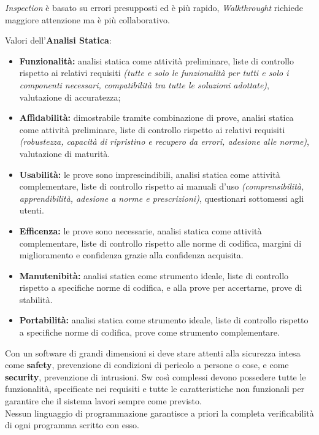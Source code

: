 \textit{Inspection} è basato su errori presupposti ed è più rapido, \textit{Walkthrought} richiede maggiore attenzione ma è più collaborativo.

Valori dell'\textbf{Analisi Statica}:

\begin{itemize}
	\item \textbf{Funzionalità:} analisi statica come attività preliminare, liste di controllo rispetto ai relativi requisiti \textit{(tutte e solo le funzionalità per tutti e solo i componenti necessari, compatibilità tra tutte le soluzioni adottate)}, valutazione di accuratezza;
	\item \textbf{Affidabilità:} dimostrabile tramite combinazione di prove, analisi statica come attività preliminare, liste di controllo rispetto ai relativi requisiti \textit{(robustezza, capacità di ripristino e recupero da errori, adesione alle norme)}, valutazione di maturità.
	\item \textbf{Usabilità:} le prove sono imprescindibili, analisi statica come attività complementare, liste di controllo rispetto ai manuali d'uso \textit{(comprensibilità, apprendibilità, adesione a norme e prescrizioni)}, questionari sottomessi agli utenti.
	\item \textbf{Efficenza:} le prove sono necessarie, analisi statica come attività complementare, liste di controllo rispetto alle norme di codifica, margini di miglioramento e confidenza grazie alla confidenza acquisita.
	\item \textbf{Manutenibità:} analisi statica come strumento ideale, liste di controllo rispetto a specifiche norme di codifica, e alla prove per accertarne, prove di stabilità.
	\item \textbf{Portabilità:} analisi statica come strumento ideale, liste di controllo rispetto a specifiche norme di codifica, prove come strumento complementare.
\end{itemize}

Con un software di grandi dimensioni si deve stare attenti alla sicurezza intesa come \textbf{safety}, prevenzione di condizioni di pericolo a persone o cose, e come \textbf{security}, prevenzione di intrusioni. Sw così complessi devono possedere tutte le funzionalità, specificate nei requisiti e tutte le caratteristiche non funzionali per garantire che il sistema lavori sempre come previsto.\\
Nessun linguaggio di programmazione garantisce a priori la completa verificabilità di ogni programma scritto con esso.\\

